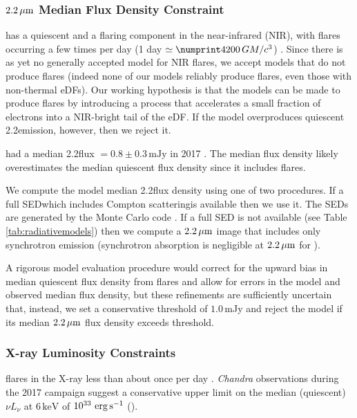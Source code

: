 \subsubsection{\texorpdfstring{$2.2\,\mu\mathrm{m}$}{2um} Median Flux Density Constraint}\label{subsec:nir}

\sgra has a quiescent and a flaring component in the near-infrared (NIR), with flares occurring a few times per day
(1 day $\simeq \no{4200}\,\tg$) \citep{2018ApJ...863...15W}.
Since there is as yet no generally accepted model for NIR flares, we accept models that do not produce flares (indeed none of our models reliably produce flares, even those with non-thermal eDFs).
Our working hypothesis is that the models can be made to produce flares by introducing a process that accelerates a small fraction of electrons into a  NIR-bright tail of the eDF.  If the model overproduces quiescent 2.2\um emission, however, then we reject it.

\sgra had a median 2.2\um flux $= 0.8 \pm 0.3\,\mathrm{mJy}$ in 2017  \citep[][see Table 1]{2020A&A...638A...2G}.
The median flux density likely overestimates the median quiescent flux density since it includes flares.

We compute the model median 2.2\um flux density using one of two procedures.
If a full SED\textemdash which includes Compton scattering\textemdash is available then we use it.
The SEDs are generated by the \grmonty Monte Carlo code \citep{2009ApJS..184..387D, Wong_2022}.
If a full SED is not available (see Table \ref{tab:radiativemodels}) then we compute a $2.2\,\mu\mathrm{m}$ image that includes only synchrotron emission (synchrotron absorption is negligible at $2.2\,\mu\mathrm{m}$ for \sgra).

A rigorous model evaluation procedure would correct for the upward bias in median quiescent flux density from flares and allow for errors in the model and observed median flux density, but these refinements are sufficiently uncertain that, instead, we set a conservative threshold of $1.0$\,mJy and reject the model if its
median $2.2\,\mu\mathrm{m}$ flux density exceeds threshold.

\subsubsection{X-ray Luminosity Constraints}

\sgra flares in the X-ray less than about once per day \citep[see][and references therein]{2018MNRAS.473..306Y}.
\emph{Chandra} observations during the 2017 campaign suggest a conservative upper limit on the median (quiescent) $\nu L_\nu$ at $6\,\mathrm{keV}$ of $10^{33}\,\,\mathrm{erg}\,\mathrm{s}^{-1}$ ().

